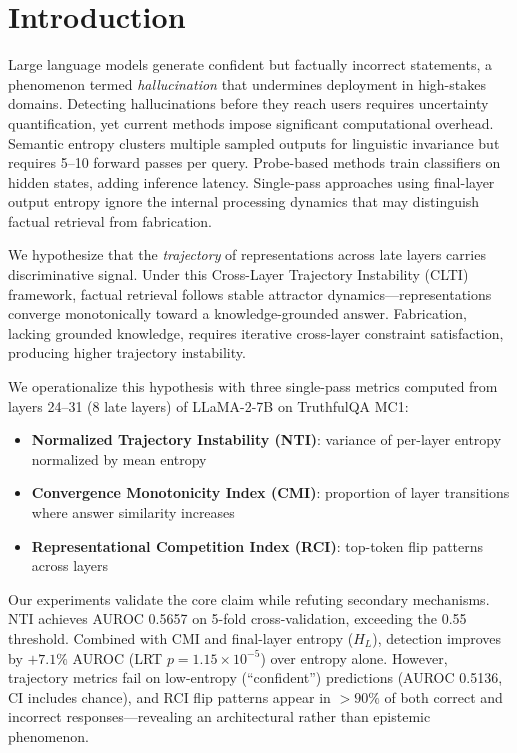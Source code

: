 \section{Introduction}

Large language models generate confident but factually incorrect statements, a phenomenon termed \emph{hallucination} that undermines deployment in high-stakes domains. Detecting hallucinations before they reach users requires uncertainty quantification, yet current methods impose significant computational overhead. Semantic entropy clusters multiple sampled outputs for linguistic invariance but requires 5--10 forward passes per query. Probe-based methods train classifiers on hidden states, adding inference latency. Single-pass approaches using final-layer output entropy ignore the internal processing dynamics that may distinguish factual retrieval from fabrication.

We hypothesize that the \emph{trajectory} of representations across late layers carries discriminative signal. Under this Cross-Layer Trajectory Instability (CLTI) framework, factual retrieval follows stable attractor dynamics---representations converge monotonically toward a knowledge-grounded answer. Fabrication, lacking grounded knowledge, requires iterative cross-layer constraint satisfaction, producing higher trajectory instability.

We operationalize this hypothesis with three single-pass metrics computed from layers 24--31 (8 late layers) of LLaMA-2-7B on TruthfulQA MC1:
\begin{itemize}
    \item \textbf{Normalized Trajectory Instability (NTI)}: variance of per-layer entropy normalized by mean entropy
    \item \textbf{Convergence Monotonicity Index (CMI)}: proportion of layer transitions where answer similarity increases
    \item \textbf{Representational Competition Index (RCI)}: top-token flip patterns across layers
\end{itemize}

Our experiments validate the core claim while refuting secondary mechanisms. NTI achieves AUROC 0.5657 on 5-fold cross-validation, exceeding the 0.55 threshold. Combined with CMI and final-layer entropy ($H_L$), detection improves by $+7.1\%$ AUROC (LRT $p = 1.15 \times 10^{-5}$) over entropy alone. However, trajectory metrics fail on low-entropy (``confident'') predictions (AUROC 0.5136, CI includes chance), and RCI flip patterns appear in $>90\%$ of both correct and incorrect responses---revealing an architectural rather than epistemic phenomenon.

